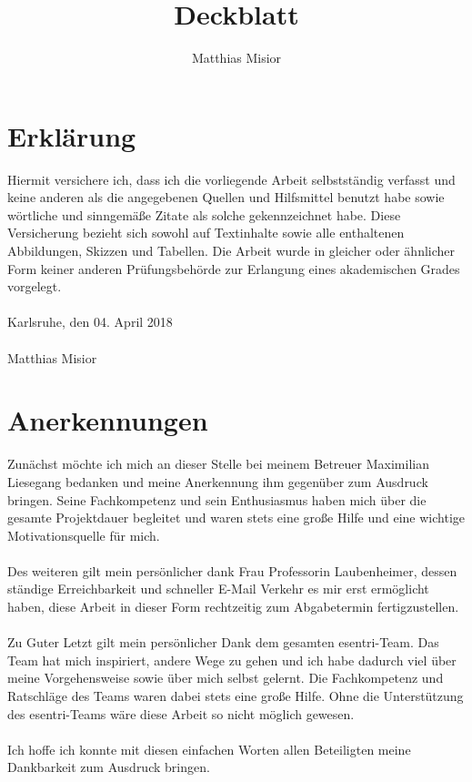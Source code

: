 \documentclass[a4paper,12pt]{scrartcl}
\title{Deckblatt}
\author{Matthias Misior}
\begin{document}
\thispagestyle{empty}
\section*{Erklärung}
Hiermit versichere ich, dass ich die vorliegende Arbeit selbstständig verfasst und keine anderen als die angegebenen Quellen und Hilfsmittel benutzt habe sowie wörtliche und sinngemäße Zitate als solche gekennzeichnet habe. Diese Versicherung bezieht sich sowohl auf
Textinhalte sowie alle enthaltenen Abbildungen, Skizzen und Tabellen. Die Arbeit wurde in gleicher oder ähnlicher Form keiner anderen Prüfungsbehörde zur Erlangung eines akademischen Grades vorgelegt.
\\\\
Karlsruhe, den 04. April 2018
\\\\
Matthias Misior \noindent\dotfill

\newpage
\thispagestyle{empty}
\section*{Anerkennungen}
Zunächst möchte ich mich an dieser Stelle bei meinem Betreuer Maximilian Liesegang bedanken und meine Anerkennung ihm gegenüber zum Ausdruck bringen. Seine Fachkompetenz und sein Enthusiasmus haben mich über die gesamte Projektdauer begleitet und waren stets eine große Hilfe und eine wichtige Motivationsquelle für mich. 
\\\\
Des weiteren gilt mein persönlicher dank Frau Professorin Laubenheimer, dessen ständige Erreichbarkeit und schneller E-Mail Verkehr es mir erst ermöglicht haben, diese Arbeit in dieser Form rechtzeitig zum Abgabetermin fertigzustellen. 
\\\\
Zu Guter Letzt gilt mein persönlicher Dank dem gesamten esentri-Team. Das Team hat mich inspiriert, andere Wege zu gehen und ich habe dadurch viel über meine Vorgehensweise sowie über mich selbst gelernt. Die Fachkompetenz und Ratschläge des Teams waren dabei stets eine große Hilfe. Ohne die Unterstützung des esentri-Teams wäre diese Arbeit so nicht möglich gewesen.
\\\\
Ich hoffe ich konnte mit diesen einfachen Worten allen Beteiligten meine Dankbarkeit zum Ausdruck bringen. 

\newpage
\thispagestyle{empty}
\end{document}
